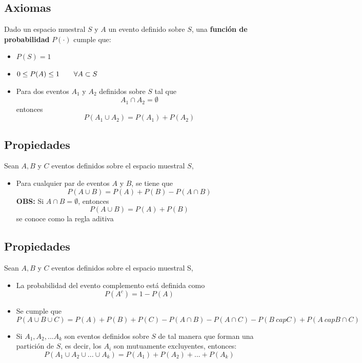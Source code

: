 \documentclass[12pt,twocolumn,a4paper]{report}
\begin{document}
\subsection*{Axiomas}
Dado un espacio muestral $S$ y $A$ un evento definido sobre $S$, una \textbf{función de probabilidad} $P(\cdot)$ cumple que:
\begin{itemize}
\setlength\itemsep{0.001cm}
\item{$P(S) = 1$}
\item{$0 \leq P(A) \leq 1 \hspace{20 px} \forall A \subset S$}
\item{Para dos eventos $A_1$ y $A_2$ definidos sobre $S$ tal que 
$$
A_1 \cap A_2 = \emptyset
$$
entonces
$$
P(A_1 \cup A_2) = P(A_1) + P(A_2)
$$}
\end{itemize}

\subsection*{Propiedades}
Sean $A,B$ y $C$ eventos definidos sobre el espacio muestral $S$,
\begin{itemize}
\setlength\itemsep{0.001cm}
\item{Para cualquier par de eventos $A$ y $B$, se tiene que
$$
P(A \cup B) = P(A) + P(B) - P(A \cap B)
$$
\textbf{OBS:} Si $A \cap B = \emptyset$, entonces
$$
P(A \cup B) = P(A) + P(B)
$$
se conoce como la regla aditiva}
\end{itemize}

\subsection*{Propiedades}
Sean $A,B$ y $C$ eventos definidos sobre el espacio muestral S, 
\begin{itemize}
\setlength\itemsep{0.001cm}
\item{La probabilidad del evento complemento está definida como 
$$
P(A^c) = 1 - P(A)
$$}
\item{Se cumple que 
$$
P(A \cup B \cup C) = P(A)+P(B)+P(C)-P(A\cap B) - P(A\cap C) - P(B\ cap C) + P(A\ cap B \cap C)
$$}
\item{Si $A_1, A_2, ... A_k$ son eventos definidos sobre $S$ de tal manera que forman una partición de $S$, es decir, los $A_i$ son mutuamente excluyentes, entonces:
$$
P(A_1 \cup A_2 \cup ... \cup A_k) = P(A_1) + P(A_2) + ... + P(A_k)
$$}
\end{itemize}
\end{document}
